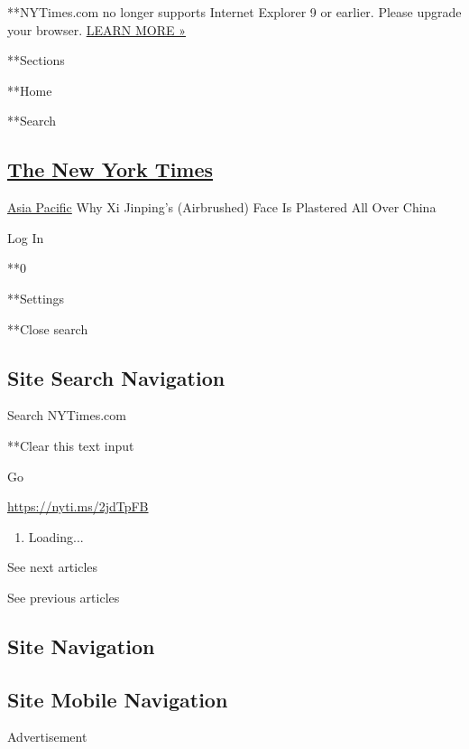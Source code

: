  **NYTimes.com no longer supports Internet Explorer 9 or earlier. Please
upgrade your browser.
\href{http://www.nytimes.com/content/help/site/ie9-support.html}{LEARN
MORE »}

**Sections

**Home

**Search

\hypertarget{the-new-york-times}{%
\subsection{\texorpdfstring{\href{http://www.nytimes.com/}{The New York
Times}}{The New York Times}}\label{the-new-york-times}}

 \href{/section/world/asia}{Asia Pacific} \textbar{}Why Xi Jinping's
(Airbrushed) Face Is Plastered All Over China

Log In

**0

**Settings

**Close search

\hypertarget{site-search-navigation}{%
\subsection{Site Search Navigation}\label{site-search-navigation}}

Search NYTimes.com

**Clear this text input

Go

\url{https://nyti.ms/2jdTpFB}

\begin{enumerate}
\def\labelenumi{\arabic{enumi}.}
\item
  Loading...
\end{enumerate}

See next articles

See previous articles

\hypertarget{site-navigation}{%
\subsection{Site Navigation}\label{site-navigation}}

\hypertarget{site-mobile-navigation}{%
\subsection{Site Mobile Navigation}\label{site-mobile-navigation}}

Advertisement

